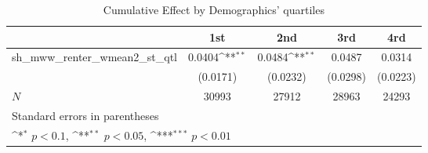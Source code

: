 \begin{table}[htbp]\centering
\def\sym#1{\ifmmode^{#1}\else\(^{#1}\)\fi}
\caption{Cumulative Effect by Demographics' quartiles}
\begin{tabular}{l*{4}{c}}
\hline\hline
            &\multicolumn{1}{c}{1st}&\multicolumn{1}{c}{2nd}&\multicolumn{1}{c}{3rd}&\multicolumn{1}{c}{4rd}\\
\hline
sh\_mww\_renter\_wmean2\_st\_qtl&      0.0404\sym{**} &      0.0484\sym{**} &      0.0487         &      0.0314         \\
            &    (0.0171)         &    (0.0232)         &    (0.0298)         &    (0.0223)         \\
\hline
\(N\)       &       30993         &       27912         &       28963         &       24293         \\
\hline\hline
\multicolumn{5}{l}{\footnotesize Standard errors in parentheses}\\
\multicolumn{5}{l}{\footnotesize \sym{*} \(p<0.1\), \sym{**} \(p<0.05\), \sym{***} \(p<0.01\)}\\
\end{tabular}
\end{table}
